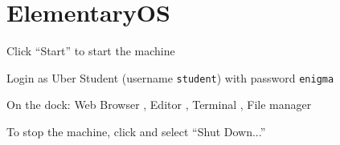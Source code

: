 \documentclass[8pt,a4paper,compress]{beamer}
\newlength{\myMheight}
\begin{document}
\section{ElementaryOS}
\begin{frame}[fragile]
\pause\transdissolve

Click ``Start'' to start the machine

\pause\transdissolve\bigskip

Login as Uber Student (username \lstinline{student}) with password \lstinline{enigma}

\pause\transdissolve\bigskip

\begin{center}
\end{center}

\pause\transdissolve\bigskip

On the dock: Web Browser , Editor , Terminal , File manager 

\pause\transdissolve\bigskip

To stop the machine, click  and select ``Shut Down...''
\end{frame}
\end{document}
